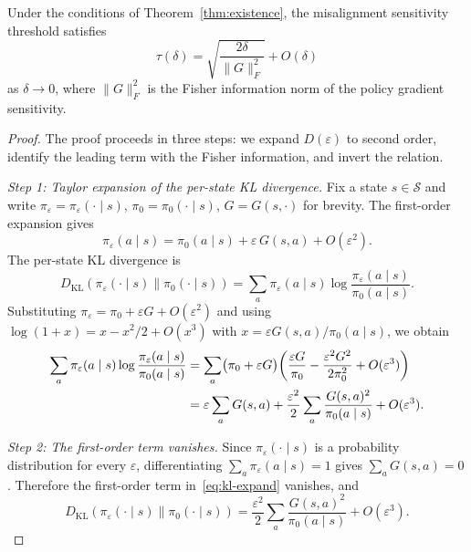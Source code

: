 \begin{theorem}\label{thm:characterization}
Under the conditions of Theorem~\ref{thm:existence}, the misalignment
sensitivity threshold satisfies
\begin{equation}\label{eq:threshold-formula}
\tau(\delta) = \sqrt{\frac{2\delta}{\lVert G \rVert_F^2}} + O(\delta)
\end{equation}
as $\delta \to 0$, where $\lVert G \rVert_F^2$ is the Fisher information
norm of the policy gradient sensitivity.
\end{theorem}

\begin{proof}
The proof proceeds in three steps: we expand $D(\varepsilon)$ to second order,
identify the leading term with the Fisher information, and invert the relation.

\emph{Step 1: Taylor expansion of the per-state KL divergence.}
Fix a state $s \in \mathcal{S}$ and write $\pi_\varepsilon = \pi_\varepsilon
(\cdot \mid s)$, $\pi_0 = \pi_0(\cdot \mid s)$, $G = G(s,\cdot)$ for
brevity. The first-order expansion gives
\[
\pi_\varepsilon(a \mid s) = \pi_0(a \mid s) + \varepsilon \, G(s,a)
  + O(\varepsilon^2).
\]
The per-state KL divergence is
\[
D_{\mathrm{KL}}(\pi_\varepsilon(\cdot \mid s) \| \pi_0(\cdot \mid s))
  = \sum_a \pi_\varepsilon(a \mid s) \log \frac{\pi_\varepsilon(a \mid s)}
  {\pi_0(a \mid s)}.
\]
Substituting $\pi_\varepsilon = \pi_0 + \varepsilon G + O(\varepsilon^2)$ and
using $\log(1+x) = x - x^2/2 + O(x^3)$ with $x = \varepsilon G(s,a) /
\pi_0(a \mid s)$, we obtain
\begin{align}
\sum_a \pi_\varepsilon(a \mid s) \log \frac{\pi_\varepsilon(a \mid s)}
  {\pi_0(a \mid s)}
&= \sum_a \bigl(\pi_0 + \varepsilon G\bigr) \biggl(\frac{\varepsilon G}
  {\pi_0} - \frac{\varepsilon^2 G^2}{2\pi_0^2} + O(\varepsilon^3)\biggr)
  \notag \\
&= \varepsilon \sum_a G(s,a) + \frac{\varepsilon^2}{2} \sum_a
  \frac{G(s,a)^2}{\pi_0(a \mid s)} + O(\varepsilon^3). \label{eq:kl-expand}
\end{align}

\emph{Step 2: The first-order term vanishes.}
Since $\pi_\varepsilon(\cdot \mid s)$ is a probability distribution for every
$\varepsilon$, differentiating $\sum_a \pi_\varepsilon(a \mid s) = 1$ gives
$\sum_a G(s,a) = 0$. Therefore the first-order term in~\eqref{eq:kl-expand}
vanishes, and
\begin{equation}\label{eq:kl-second-order}
D_{\mathrm{KL}}(\pi_\varepsilon(\cdot \mid s) \| \pi_0(\cdot \mid s))
  = \frac{\varepsilon^2}{2} \sum_a \frac{G(s,a)^2}{\pi_0(a \mid s)}
  + O(\varepsilon^3).
\end{equation}


\end{proof}
